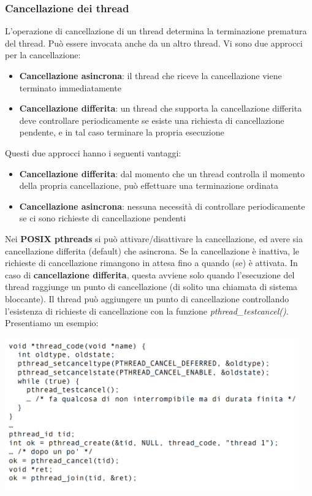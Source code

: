 \documentclass[12pt]{article}
\begin{document}
\subsubsection{Cancellazione dei thread}
L'operazione di cancellazione di un thread determina la terminazione prematura del thread.
Può essere invocata anche da un altro thread.
Vi sono due approcci per la cancellazione:
\begin{itemize}
    \item \textbf{Cancellazione asincrona}: il thread che riceve la cancellazione viene terminato immediatamente
    \item \textbf{Cancellazione differita}: un thread che supporta la cancellazione differita deve controllare periodicamente se esiste una richiesta di cancellazione pendente, e in tal caso terminare la propria esecuzione
\end{itemize}
Questi due approcci hanno i seguenti vantaggi:
\begin{itemize}
    \item \textbf{Cancellazione differita}: dal momento che un thread controlla il momento della propria cancellazione, può effettuare una terminazione ordinata
    \item \textbf{Cancellazione asincrona}: nessuna necessità di controllare periodicamente se ci sono richieste di cancellazione pendenti
\end{itemize}
Nei \textbf{POSIX pthreads} si può attivare/disattivare la cancellazione, ed avere sia cancellazione differita (default) che asincrona.
Se la cancellazione è inattiva, le richieste di cancellazione rimangono in attesa fino a quando (se) è attivata.
In caso di \textbf{cancellazione differita}, questa avviene solo quando l'esecuzione del thread raggiunge un punto di cancellazione (di solito una chiamata di sistema bloccante).
Il thread può aggiungere un punto di cancellazione controllando l'esistenza di richieste di cancellazione con la funzione \textit{pthread\_testcancel()}.
Presentiamo un esempio:
\begin{center}
    \includegraphics[width = 0.95\textwidth]{Images/17.png}
\end{center}
\end{document}
